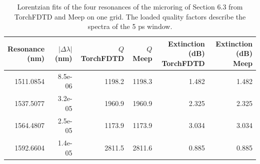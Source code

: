 \begin{table}[tbp]
\centering
\small
\renewcommand{\arraystretch}{1.15}
\caption{Lorentzian fits of the four resonances of the microring of Section 6.3 from TorchFDTD and Meep on one grid. The loaded quality factors describe the spectra of the 5 ps window.}
\label{tab:si-microring}
\begin{tabular}{@{}rrrrrr@{}}
\toprule
\shortstack{Resonance\\(nm)} & \shortstack{$|\Delta\lambda|$\\(nm)} & \shortstack{$Q$\\TorchFDTD} & \shortstack{$Q$\\Meep} & \shortstack{Extinction (dB)\\TorchFDTD} & \shortstack{Extinction (dB)\\Meep} \\
\midrule
1511.0854 & 8.5e-06 & 1198.2 & 1198.3 & 1.482 & 1.482 \\
1537.5077 & 3.2e-05 & 1960.9 & 1960.9 & 2.325 & 2.325 \\
1564.4807 & 2.5e-05 & 1173.9 & 1173.9 & 3.034 & 3.034 \\
1592.6604 & 1.4e-05 & 2811.5 & 2811.6 & 0.885 & 0.885 \\
\bottomrule
\end{tabular}
\end{table}
